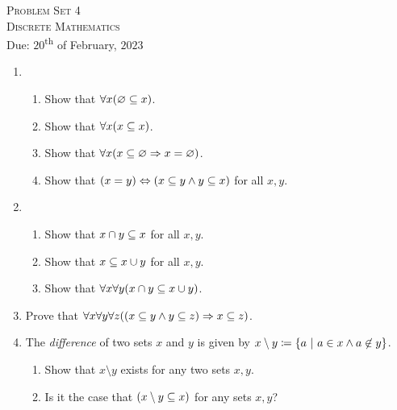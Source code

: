 




\begin{center}
    \textsc{\huge Problem Set 4}\\
    \textsc{Discrete Mathematics}\\
    {\color{gruvred}Due: $20$\textsuperscript{th} of February, $2023$}
\end{center}

\begin{enumerate}
    \item
        \begin{enumerate}
            \item
                Show that \(\forall x \pn*{\emptyset \subseteq x}\).
            \item
                Show that \(\forall x \pn*{x \subseteq x}\).
            \item
                Show that \(\forall x \pn*{x \subseteq \emptyset \implies x = \emptyset}\).
            \item
                Show that \(\pn*{x = y} \iff \pn*{x \subseteq y \meet y \subseteq x}\) for all \(x, y\).
        \end{enumerate}
    \item
        \begin{enumerate}
            \item
                Show that \(x \cap y \subseteq x\) for all \(x, y\).
            \item
                Show that \(x \subseteq x \cup y\) for all \(x, y\).
            \item
                Show that \(\forall x \forall y \pn*{x \intersect y \subseteq x \union y}\).
        \end{enumerate}
    \item
        Prove that \(\forall x \forall y \forall z \pn*{\pn*{x \subseteq y \meet y \subseteq z}
                                                        \implies x \subseteq z}\).
    \item
        The \emph{difference} of two sets \(x\) and \(y\) is given by
        \(x \setminus y \defn \set*{a \suchthat a \in x \meet a \not \in y}\).
        \begin{enumerate}
            \item
                Show that \(x \setminus y\) exists for any two sets \(x, y\).
            \item
                Is it the case that \(\pn*{x \setminus y \subseteq x}\) for any sets \(x, y\)?

\end{enumerate}
\end{enumerate}

